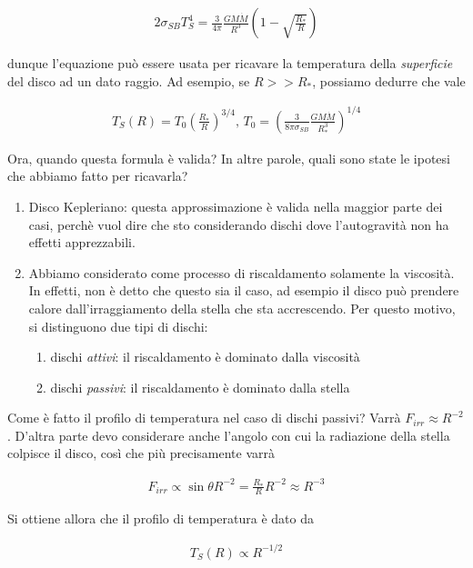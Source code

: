 \documentclass{report}
\begin{document}
\begin{align}
    2\sigma_{SB}T_S^4 = \frac{3}{4\pi}\frac{GM\dot{M}}{R^3}\left(1- \sqrt{\frac{R_*}{R}} \right)
\end{align}

dunque l'equazione può essere usata per ricavare la temperatura della \emph{superficie} del disco ad un dato raggio. Ad esempio, se \(R >> R_*\), possiamo dedurre che vale 

\begin{align}
    T_S(R) = T_0 \left(\frac{R_*}{R}\right)^{3/4}, \, T_0 = \left(\frac{3}{8\pi\sigma_{SB}}\frac{GM\dot{M}}{R_*^3} \right)^{1/4}
\end{align}

Ora, quando questa formula è valida? In altre parole, quali sono state le ipotesi che abbiamo fatto per ricavarla? 

\begin{enumerate}
    \item Disco Kepleriano: questa approssimazione è valida nella maggior parte dei casi, perchè vuol dire che sto considerando dischi dove l'autogravità non ha effetti apprezzabili. 
    \item Abbiamo considerato come processo di riscaldamento solamente la viscosità. In effetti, non è detto che questo sia il caso, ad esempio il disco può prendere calore dall'irraggiamento della stella che sta accrescendo. Per questo motivo, si distinguono due tipi di dischi: 
    \begin{enumerate}
        \item dischi \emph{attivi}: il riscaldamento è dominato dalla viscosità
        \item dischi \emph{passivi}: il riscaldamento è dominato dalla stella 
    \end{enumerate}
\end{enumerate}


Come è fatto il profilo di temperatura nel caso di dischi passivi? Varrà \(F_{irr} \approx R^{-2}\). D'altra parte devo considerare anche l'angolo con cui la radiazione della stella colpisce il disco, così che più precisamente varrà 

\begin{align}
    F_{irr} \propto \sin\theta R^{-2} = \frac{R_*}{R}R^{-2} \approx R^{-3}
\end{align}

Si ottiene allora che il profilo di temperatura è dato da 

\begin{align}
    T_S (R) \propto R^{-1/2}
\end{align}
\end{document}

